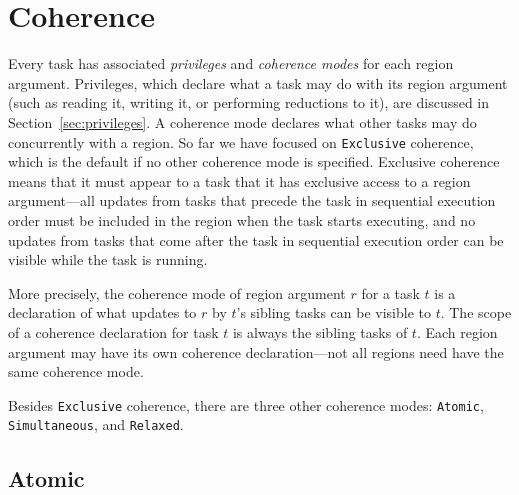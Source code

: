 \chapter{Coherence}
\label{chap:coherence}

Every task has associated {\em privileges} and {\em coherence modes} for each region argument.  Privileges, which
declare what a task may do with its region argument (such as reading it, writing it, or performing reductions to it), are discussed in Section~\ref{sec:privileges}.  A coherence mode declares what other tasks may do concurrently
with a region.  So far we have focused on {\tt Exclusive} coherence, which is the default if no other coherence mode is specified.  Exclusive coherence means that it must
appear to a task that it has exclusive access to a region argument---all updates from tasks that precede the task in sequential execution order must be included in the region
when the task starts executing, and no updates from tasks that come after the task in sequential execution order can be visible while the task is running.

More precisely, the coherence mode of region argument $r$ for a task $t$ is a declaration of what updates to $r$ by $t$'s sibling tasks can be visible to $t$.  The scope of a coherence declaration for task $t$ is always the sibling tasks of $t$.  Each region argument may have its own coherence declaration---not all regions
need have the same coherence mode.

Besides {\tt Exclusive} coherence, there are three other coherence modes: {\tt Atomic}, {\tt Simultaneous}, and {\tt Relaxed}.

\section{Atomic}
\label{sec:atomic}

\begin{figure}
  {\small
    
  }
  \caption{}
  \label{fig:atomic}
\end{figure}

